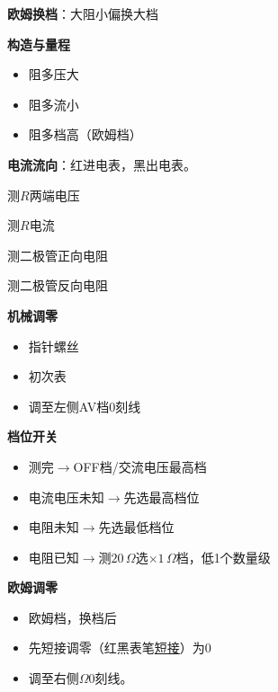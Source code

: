 \textbf{欧姆换档}：大阻小偏换大档

\textbf{构造与量程}
\begin{itemize}
\item 阻多压大
\item 阻多流小
\item 阻多档高（欧姆档）
\end{itemize}

\textbf{电流流向}：红进电表，黑出电表。

\begin{center}
\begin{minipage}[t]{0.23\linewidth}\centering
{}
测$R$两端电压
\end{minipage}\hfill
\begin{minipage}[t]{0.23\linewidth}\centering
{}
测$R$电流
\end{minipage}\hfill
\begin{minipage}[t]{0.23\linewidth}\centering
{}
测二极管正向电阻
\end{minipage}\hfill
\begin{minipage}[t]{0.23\linewidth}\centering
{}
测二极管反向电阻
\end{minipage}
\end{center}

\textbf{机械调零}
\begin{itemize}
\item 指针螺丝
\item 初次表
\item 调至左侧AV档0刻线
\end{itemize}

\textbf{档位开关}
\begin{itemize}
\item 测完$\to$OFF档/交流电压最高档
\item 电流电压未知$\to$先选最高档位
\item 电阻未知$\to$先选最低档位
\item 电阻已知$\to$测$20\,\Omega$选$\times1\,\Omega$档，低1个数量级
\end{itemize}

\textbf{欧姆调零}
\begin{itemize}
\item 欧姆档，换档后
\item 先短接调零（红黑表笔\underline{短接}）为0
\item 调至右侧$\Omega$0刻线。
\end{itemize}

